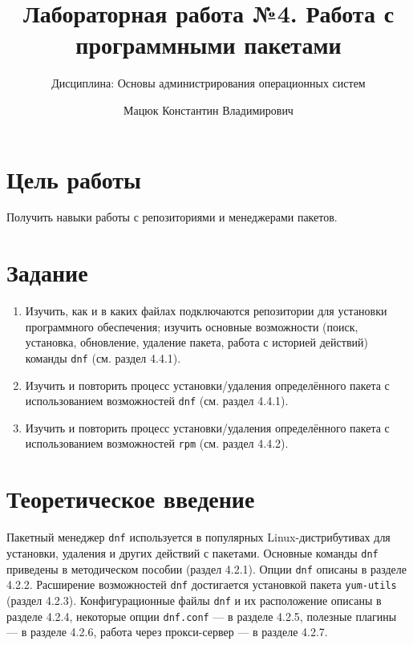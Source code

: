 \documentclass[
  english,
  russian,
  12pt,
  a4paper,
  DIV=11,
  numbers=noendperiod]{scrreprt}
\title{Лабораторная работа №4. Работа с программными пакетами}
\subtitle{Дисциплина: Основы администрирования операционных систем}
\author{Мацюк Константин Владимирович}
\date{}
\providecommand{\tightlist}{%
  \setlength{\itemsep}{0pt}\setlength{\parskip}{0pt}}
\renewcommand*\contentsname{Содержание}
\newcommand\contentsname{Содержание}
\begin{document}
\maketitle

\renewcommand*\contentsname{Содержание}
{
\setcounter{tocdepth}{1}
\tableofcontents
}
\listoffigures
\listoftables

\chapter{Цель
работы}\label{ux446ux435ux43bux44c-ux440ux430ux431ux43eux442ux44b}

Получить навыки работы с репозиториями и менеджерами пакетов.

\chapter{Задание}\label{ux437ux430ux434ux430ux43dux438ux435}

\begin{enumerate}
\def\labelenumi{\arabic{enumi}.}
\tightlist
\item
  Изучить, как и в каких файлах подключаются репозитории для установки
  программного обеспечения; изучить основные возможности (поиск,
  установка, обновление, удаление пакета, работа с историей действий)
  команды \texttt{dnf} (см. раздел 4.4.1).
\item
  Изучить и повторить процесс установки/удаления определённого пакета с
  использованием возможностей \texttt{dnf} (см. раздел 4.4.1).
\item
  Изучить и повторить процесс установки/удаления определённого пакета с
  использованием возможностей \texttt{rpm} (см. раздел 4.4.2).
\end{enumerate}

\chapter{Теоретическое
введение}\label{ux442ux435ux43eux440ux435ux442ux438ux447ux435ux441ux43aux43eux435-ux432ux432ux435ux434ux435ux43dux438ux435}

Пакетный менеджер \texttt{dnf} используется в популярных
Linux-дистрибутивах для установки, удаления и других действий с
пакетами. Основные команды \texttt{dnf} приведены в методическом пособии
(раздел 4.2.1). Опции \texttt{dnf} описаны в разделе 4.2.2. Расширение
возможностей \texttt{dnf} достигается установкой пакета
\texttt{yum-utils} (раздел 4.2.3). Конфигурационные файлы \texttt{dnf} и
их расположение описаны в разделе 4.2.4, некоторые опции
\texttt{dnf.conf} --- в разделе 4.2.5, полезные плагины --- в разделе
4.2.6, работа через прокси-сервер --- в разделе 4.2.7.
\end{document}
